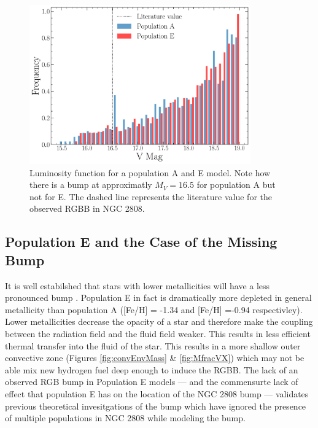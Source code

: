 \begin{figure}
  \centering
  \includegraphics[width=0.85\textwidth]{figures/rgbb/ComparisonOfRGBBump.pdf}
  \caption{Luminosity function for a population A and E model. Note how there
  is a bump at approximatly $M_{V} = 16.5$ for population A but not for E. The
  dashed line represents the literature value for the observed RGBB in NGC
  2808.}
  \label{fig:LumFAE}
\end{figure}

\subsection{Population E and the Case of the Missing Bump}
It is well estabilshed that stars with lower metallicities will have a less
pronounced bump \addcite. Population E in fact is dramatically more depleted in
general metallicity than population A ([Fe/H] = -1.34 and [Fe/H] =-0.94
respectivley). Lower metallicities decrease the opacity of a star and therefore
make the coupling between the radiation field and the fluid field weaker. This
results in less efficient thermal transfer into the fluid of the star. This
results in a more shallow outer convective zone (Figures \ref{fig:convEnvMass}
\& \ref{fig:MfracVX}) which may not be able mix new hydrogen fuel deep enough to
induce the RGBB. The lack of an observed RGB bump in Population E models --- and
the commensurte lack of effect that population E has on the location of the NGC
2808 bump --- validates previous theoretical invesitgations of the bump which
have ignored the presence of multiple populations in NGC 2808 while modeling the
bump.


